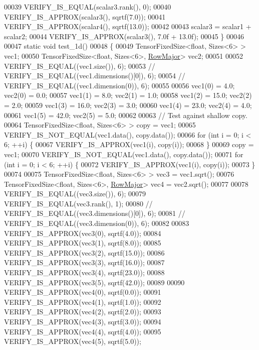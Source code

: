 \begin{DoxyCode}
00039   VERIFY\_IS\_EQUAL(scalar3.rank(), 0);
00040   VERIFY\_IS\_APPROX(scalar3(), sqrtf(7.0));
00041   VERIFY\_IS\_APPROX(scalar4(), sqrtf(13.0));
00042 
00043   scalar3 = scalar1 + scalar2;
00044   VERIFY\_IS\_APPROX(scalar3(), 7.0f + 13.0f);
00045 \}
00046 
00047 \textcolor{keyword}{static} \textcolor{keywordtype}{void} test\_1d()
00048 \{
00049   TensorFixedSize<float, Sizes<6> > vec1;
00050   TensorFixedSize<float, Sizes<6>, \hyperlink{group__enums_ggaacded1a18ae58b0f554751f6cdf9eb13acfcde9cd8677c5f7caf6bd603666aae3}{RowMajor}> vec2;
00051 
00052   VERIFY\_IS\_EQUAL((vec1.size()), 6);
00053   \textcolor{comment}{//  VERIFY\_IS\_EQUAL((vec1.dimensions()[0]), 6);}
00054   \textcolor{comment}{//  VERIFY\_IS\_EQUAL((vec1.dimension(0)), 6);}
00055 
00056   vec1(0) = 4.0;  vec2(0) = 0.0;
00057   vec1(1) = 8.0;  vec2(1) = 1.0;
00058   vec1(2) = 15.0; vec2(2) = 2.0;
00059   vec1(3) = 16.0; vec2(3) = 3.0;
00060   vec1(4) = 23.0; vec2(4) = 4.0;
00061   vec1(5) = 42.0; vec2(5) = 5.0;
00062 
00063   \textcolor{comment}{// Test against shallow copy.}
00064   TensorFixedSize<float, Sizes<6> > copy = vec1;
00065   VERIFY\_IS\_NOT\_EQUAL(vec1.data(), copy.data());
00066   \textcolor{keywordflow}{for} (\textcolor{keywordtype}{int} i = 0; i < 6; ++i) \{
00067     VERIFY\_IS\_APPROX(vec1(i), copy(i));
00068   \}
00069   copy = vec1;
00070   VERIFY\_IS\_NOT\_EQUAL(vec1.data(), copy.data());
00071   \textcolor{keywordflow}{for} (\textcolor{keywordtype}{int} i = 0; i < 6; ++i) \{
00072     VERIFY\_IS\_APPROX(vec1(i), copy(i));
00073   \}
00074 
00075   TensorFixedSize<float, Sizes<6> > vec3 = vec1.sqrt();
00076   TensorFixedSize<float, Sizes<6>, \hyperlink{group__enums_ggaacded1a18ae58b0f554751f6cdf9eb13acfcde9cd8677c5f7caf6bd603666aae3}{RowMajor}> vec4 = vec2.sqrt();
00077 
00078   VERIFY\_IS\_EQUAL((vec3.size()), 6);
00079   VERIFY\_IS\_EQUAL(vec3.rank(), 1);
00080   \textcolor{comment}{//  VERIFY\_IS\_EQUAL((vec3.dimensions()[0]), 6);}
00081   \textcolor{comment}{//  VERIFY\_IS\_EQUAL((vec3.dimension(0)), 6);}
00082 
00083   VERIFY\_IS\_APPROX(vec3(0), sqrtf(4.0));
00084   VERIFY\_IS\_APPROX(vec3(1), sqrtf(8.0));
00085   VERIFY\_IS\_APPROX(vec3(2), sqrtf(15.0));
00086   VERIFY\_IS\_APPROX(vec3(3), sqrtf(16.0));
00087   VERIFY\_IS\_APPROX(vec3(4), sqrtf(23.0));
00088   VERIFY\_IS\_APPROX(vec3(5), sqrtf(42.0));
00089 
00090   VERIFY\_IS\_APPROX(vec4(0), sqrtf(0.0));
00091   VERIFY\_IS\_APPROX(vec4(1), sqrtf(1.0));
00092   VERIFY\_IS\_APPROX(vec4(2), sqrtf(2.0));
00093   VERIFY\_IS\_APPROX(vec4(3), sqrtf(3.0));
00094   VERIFY\_IS\_APPROX(vec4(4), sqrtf(4.0));
00095   VERIFY\_IS\_APPROX(vec4(5), sqrtf(5.0));

\end{DoxyCode}
